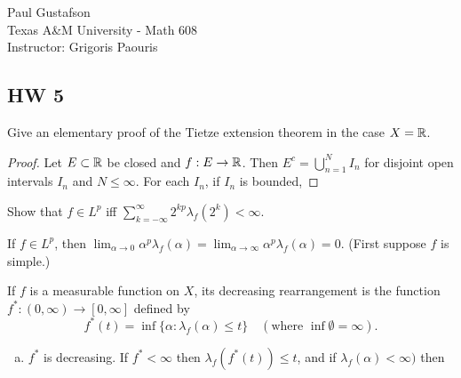 \documentclass{article}
\begin{document}
\noindent Paul Gustafson\\
\noindent Texas A\&M University - Math 608 \\ 
\noindent Instructor: Grigoris Paouris

\subsection*{HW 5}
 Give an elementary proof of the Tietze extension theorem in the case $X = \mathbb{R}$.
\begin{proof}
Let $E \subset \mathbb{R}$ be closed and $f : E \to \mathbb{R}$. Then $E^c = \bigcup_{n=1}^N I_n$ for disjoint open intervals $I_n$ and $N \le \infty$. For each $I_n$, if $I_n$ is bounded, 

\end{proof}

 Show that $f \in L^p$ iff $\sum_{k= -\infty}^\infty 2^{kp} \lambda_f(2^k) < \infty$.

 If $f \in L^p$, then $\lim_{\alpha \to 0} \alpha^p \lambda_f(\alpha) = \lim_{\alpha \to \infty} \alpha^p \lambda_f(\alpha) = 0$. (First suppose $f$ is simple.)

 If $f$ is a measurable function on $X$, its decreasing rearrangement is the function $f^*: (0,\infty) \to [0,\infty]$ defined by 
$$f^*(t) = \inf\{\alpha : \lambda_f(\alpha) \le t\} \quad (\text{where } \inf \emptyset = \infty).$$
\begin{enumerate}[a.]
\item $f^*$ is decreasing. If $f^* < \infty$ then $\lambda_f(f^*(t)) \le t$, and if $\lambda_f(\alpha) < \infty)$ then 
\end{enumerate}

\end{document}
